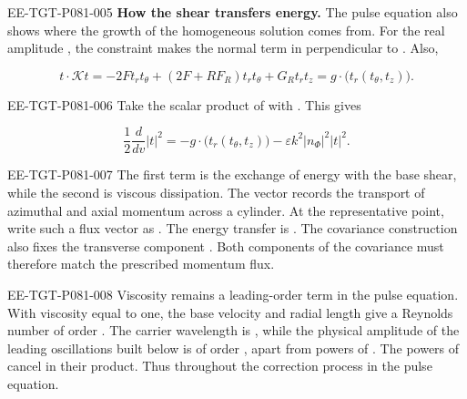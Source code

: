 \begin{EESegment}{EE-TGT-P081-005}
\textbf{How the shear transfers energy.}
The pulse equation also shows where the growth of the homogeneous solution comes from. For the real amplitude , the constraint  makes the normal term in  perpendicular to . Also,
\end{EESegment}
\[
  t\cdot\mathcal Kt=-2F t_rt_\theta+(2F+RF_R)t_rt_\theta+G_Rt_rt_z
  =g\cdot\bigl(t_r(t_\theta,t_z)\bigr).
\]
\begin{EESegment}{EE-TGT-P081-006}
Take the scalar product of  with . This gives
\end{EESegment}
\begin{equation}
  \frac12\frac{d}{dv}|t|^2
  =-g\cdot\bigl(t_r(t_\theta,t_z)\bigr)
  -\varepsilon k^2|n_\Phi|^2|t|^2.
  \tag{7.22}\label{eq:7.22}
\end{equation}
\begin{EESegment}{EE-TGT-P081-007}
The first term is the exchange of energy with the base shear, while the second is viscous dissipation. The vector  records the transport of azimuthal and axial momentum across a cylinder. At the representative point, write such a flux vector as . The energy transfer is . The covariance construction also fixes the transverse component . Both components of the covariance must therefore match the prescribed momentum flux.
\end{EESegment}

\begin{EESegment}{EE-TGT-P081-008}
Viscosity remains a leading-order term in the pulse equation. With viscosity equal to one, the base velocity and radial length give a Reynolds number of order . The carrier wavelength is , while the physical amplitude of the leading oscillations built below is of order , apart from powers of . The powers of  cancel in their product. Thus  throughout the correction process in the pulse equation.
\end{EESegment}


